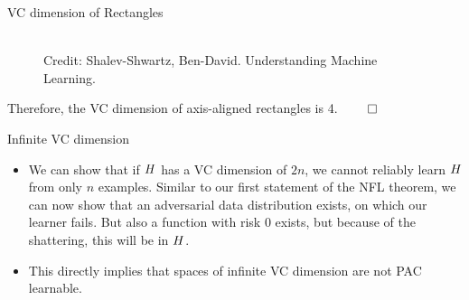 \begin{vbframe}{VC dimension of Rectangles}
    \begin{figure}
      \centering
        \tiny{\\Credit: Shalev-Shwartz, Ben-David. Understanding Machine Learning.}
    \end{figure}
\vspace{-0.3cm}
Therefore, the VC dimension of axis-aligned rectangles is 4.
\hspace*{\fill}   $\qed$ \\[0.2cm]
\framebreak

\end{vbframe}

\begin{vbframe}{Infinite VC dimension}


\begin{itemize}
\item We can show that if $H$ has a VC dimension of $2n$, we cannot reliably learn $H$ from only $n$ examples. Similar to our first statement of the NFL theorem, we can now show that an adversarial data distribution exists, on which our learner fails. But also a function with risk 0 exists, but because of the shattering, this will be in $H$. 
\item This directly implies that spaces of infinite VC dimension are not PAC learnable.
\end{itemize}

\end{vbframe}

